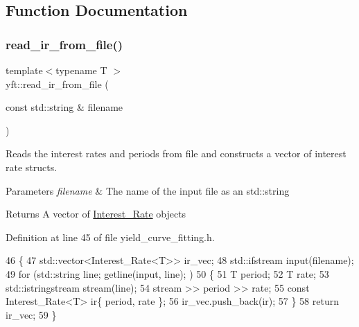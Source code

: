 \subsection{Function Documentation}
\mbox{\label{namespaceyft_a5e004e321696f199f8cf25b1dc604108}} 
\subsubsection{\texorpdfstring{read\+\_\+ir\+\_\+from\+\_\+file()}{read\_ir\_from\_file()}}
{\footnotesize\ttfamily template$<$typename T $>$ \\
yft\+::read\+\_\+ir\+\_\+from\+\_\+file (\begin{DoxyParamCaption}\item[{const std\+::string \&}]{filename }\end{DoxyParamCaption})}



Reads the interest rates and periods from file and constructs a vector of interest rate structs. 


\begin{DoxyParams}{Parameters}
{\em filename} & The name of the input file as an std\+::string \\
\hline
\end{DoxyParams}
\begin{DoxyReturn}{Returns}
A vector of \hyperlink{structyft_1_1_interest___rate}{Interest\+\_\+\+Rate} objects 
\end{DoxyReturn}


Definition at line 45 of file yield\+\_\+curve\+\_\+fitting.\+h.


\begin{DoxyCode}
46     \{
47         std::vector<Interest\_Rate<T>> ir\_vec;
48         std::ifstream input(filename);
49         \textcolor{keywordflow}{for} (std::string line; getline(input, line); )
50         \{
51             T period;
52             T rate;
53             std::istringstream stream(line);
54             stream >> period >> rate;
55             \textcolor{keyword}{const} Interest\_Rate<T> ir\{ period, rate \};
56             ir\_vec.push\_back(ir);
57         \}
58         \textcolor{keywordflow}{return} ir\_vec;
59     \}
\end{DoxyCode}
